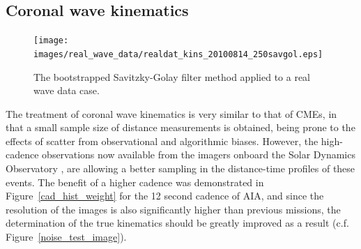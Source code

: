 \documentclass[structabstract]{aa}
\begin{document}





\subsection{Coronal wave kinematics}
\label{subsect:corpita}

\begin{figure}[!t]
\centering
\texttt{[image: images/real\_wave\_data/realdat\_kins\_20100814\_250savgol.eps]}
\caption{The bootstrapped Savitzky-Golay filter method applied to a real wave data case.} %
\label{fig_savgol_wave}
\end{figure}

The treatment of coronal wave kinematics is very similar to that of CMEs, in that a small sample size of distance measurements is obtained, being prone to the effects of scatter from observational and algorithmic biases. However, the high-cadence observations now available from the imagers onboard the Solar Dynamics Observatory \citep[SDO; ][]{}, are allowing a better sampling in the distance-time profiles of these events. The benefit of a higher cadence was demonstrated in Figure~\ref{cad_hist_weight} for the 12 second cadence of AIA, and since the resolution of the images is also significantly higher than previous missions, the determination of the true kinematics should be greatly improved as a result (c.f. Figure~\ref{noise_test_image}).
\end{document}
